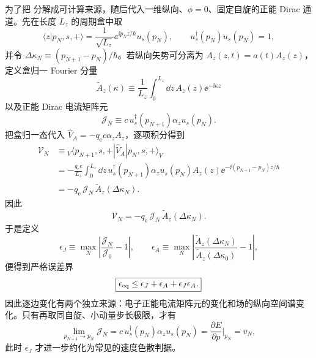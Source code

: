 为了把 分解成可计算来源，随后代入一维纵向、$\phi=0$、固定自旋的正能 Dirac 通道。先在长度 $L_z$ 的周期盒中取
\begin{equation*}
 \langle z|p_N,s,+\rangle
 =\frac{1}{\sqrt{L_z}}\ee^{\ii p_Nz/\hbar}u_s(p_N),
 \qquad u_s^\dagger(p_N)u_s(p_N)=1,
\end{equation*}
并令 $\Delta\kappa_N\equiv(p_{N+1}-p_N)/\hbar$。若纵向矢势可分离为 $A_z(z,t)=a(t)A_z(z)$，定义盒归一 Fourier 分量
\begin{equation*}
 \widetilde A_z(\kappa)
 \equiv\frac1{L_z}\int_0^{L_z}\dd z\,A_z(z)\ee^{-\ii\kappa z}
\end{equation*}
以及正能 Dirac 电流矩阵元
\begin{equation*}
 \mathcal J_N
 \equiv c\,u_s^\dagger(p_{N+1})\alpha_z u_s(p_N).
\end{equation*}
把盒归一态代入 $\hat V_A=-q_{\mathrm e} c\alpha_zA_z$，逐项积分得到
\begin{align*}
\mathcal V_N
&\equiv {}_V\!\langle p_{N+1},s,+|\hat V_A|p_N,s,+\rangle_V\\
&=-\frac{q_{\mathrm e} c}{L_z}
\int_0^{L_z}\dd z\,
 u_s^\dagger(p_{N+1})\alpha_z u_s(p_N)
 A_z(z)\ee^{-\ii(p_{N+1}-p_N)z/\hbar}\\
&=-q_{\mathrm e}\,\mathcal J_N\,\widetilde A_z(\Delta\kappa_N).
\end{align*}
因此
\begin{equation}
 \boxed{
 \mathcal V_N
 =-q_{\mathrm e}\,\mathcal J_N\,\widetilde A_z(\Delta\kappa_N).}
 \label{eq:pinem-edge-matrix-element-dirac-dp116}
\end{equation}
于是定义
\begin{equation*}
 \epsilon_J
 \equiv\max_N\left|\frac{\mathcal J_N}{\mathcal J_0}-1\right|,
 \qquad
 \epsilon_A
 \equiv\max_N\left|
 \frac{\widetilde A_z(\Delta\kappa_N)}
 {\widetilde A_z(\Delta\kappa_0)}-1\right|,
\end{equation*}
便得到严格误差界
\begin{equation}
 \boxed{
 \epsilon_{\rm eq}
 \le\epsilon_J+\epsilon_A+\epsilon_J\epsilon_A.}
 \label{eq:pinem-equal-coupling-error-dp68}
\end{equation}
因此逐边变化有两个独立来源：电子正能电流矩阵元的变化和场的纵向空间谱变化。只有再取同自旋、小动量步长极限，才有
\begin{equation*}
 \lim_{p_{N+1}\to p_N}\mathcal J_N
 =c\,u_s^\dagger(p_N)\alpha_z u_s(p_N)
 =\frac{\partial E}{\partial p}\bigg|_{p_N}
 =v_N,
\end{equation*}
此时 $\epsilon_J$ 才进一步约化为常见的速度色散判据。

